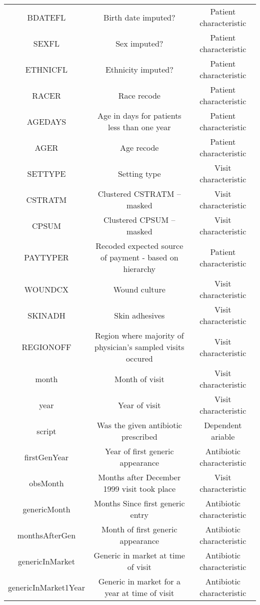 \documentclass[11pt]{SelfArxOneColBMN}
\begin{document}
\begin{table*}[t]
\begin{tabular}{|c|c|c|}
    BDATEFL & Birth date imputed? & Patient characteristic\\
    SEXFL & Sex imputed? & Patient characteristic\\
    ETHNICFL & Ethnicity imputed? & Patient characteristic\\
    RACER & Race recode & Patient characteristic\\
    AGEDAYS & Age in days for patients less than one year & Patient characteristic\\
    AGER & Age recode & Patient characteristic\\
    SETTYPE & Setting type & Visit characteristic\\
    CSTRATM & Clustered CSTRATM -- masked & Visit characteristic\\
    CPSUM & Clustered CPSUM -- masked & Visit characteristic\\
    PAYTYPER & Recoded expected source of payment - based on hierarchy & Patient characteristic\\
    WOUNDCX & Wound culture & Visit characteristic\\
    SKINADH & Skin adhesives & Visit characteristic\\
    REGIONOFF & Region where majority of physician's sampled visits occured & Visit characteristic\\
    month & Month of visit & Visit characteristic\\
    year & Year of visit & Visit characteristic\\
    script & Was the given antibiotic prescribed & Dependent ariable\\
    firstGenYear & Year of first generic appearance & Antibiotic characteristic \\
    obsMonth & Months after December 1999 visit took place & Visit characteristic\\
    genericMonth & Months Since first generic entry & Antibiotic characteristic\\
    monthsAfterGen & Month of first generic appearance & Antibiotic characteristic\\
    genericInMarket & Generic in market at time of visit & Antibiotic characteristic\\
    genericInMarket1Year & Generic in market for a year at time of visit & Antibiotic characteristic\\
  \hline
  \end{tabular}
  \label{tab:1}
\end{table*}
\end{document}
